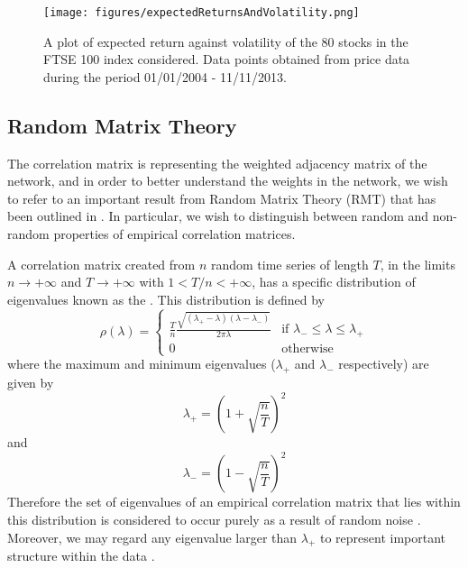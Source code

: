 \begin{figure}
	\centering
	\texttt{[image: figures/expectedReturnsAndVolatility.png]}
	\caption[Plot of expected return against volatility for 80 FTSE 100 stocks.]{\label{fig:expectedReturnsAndVolatility} A plot of expected return against volatility of the 80 stocks in the FTSE 100 index considered. Data points obtained from price data during the period 01/01/2004 - 11/11/2013.}
\end{figure}


\subsection{Random Matrix Theory}
\label{subsec:randomMatrixTheory}

The correlation matrix is representing the weighted adjacency matrix of the network, and in order to better understand the weights in the network, we wish to refer to an important result from Random Matrix Theory (RMT) that has been outlined in \cite{SM99,PGR+99,PBL05,MG13}. In particular, we wish to distinguish between random and non-random properties of empirical correlation matrices.

A correlation matrix created from $n$ random time series of length $T$, in the limits $n \rightarrow +\infty$ and $T \rightarrow +\infty$ with $1 < T/n < +\infty$, has a specific distribution of eigenvalues known as the  \cite{SM99,PBL05,FPW+11,MG13}. This distribution is defined by 
\begin{equation}
	\label{def:senguptaMitraDistribution}
	\rho(\lambda) =	
	\begin{cases}
		\frac{T}{n}\frac{\sqrt{(\lambda_{+} - \lambda)(\lambda - \lambda_{-})}}{2\pi\lambda}& \text{if } \lambda_{-} \leq \lambda \leq \lambda_{+} \\
		0 & \text{otherwise}
	\end{cases}
\end{equation}
where the maximum and minimum eigenvalues ($\lambda_{+}$ and $\lambda_{-}$ respectively) are given by
\begin{equation}
\label{eq:maxEigenvalueSM}
	\lambda_{+} = \left(1+\sqrt{\frac{n}{T}}\right)^{2}
\end{equation}
and
\begin{equation}
\label{eq:minEigenvalueSM}
	\lambda_{-} = \left(1-\sqrt{\frac{n}{T}}\right)^{2}
\end{equation}
Therefore the set of eigenvalues of an empirical correlation matrix that lies within this distribution is considered to occur purely as a result of random noise \cite{PBL05,FPW+11,MG13}. Moreover, we may regard any eigenvalue larger than $\lambda_{+}$ to represent important structure within the data \cite{PBL05,FPW+11,MG13}.

